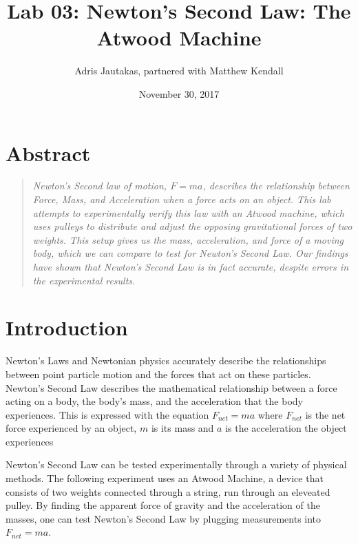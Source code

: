 \documentclass[12pt]{article}
\title{Lab 03: Newton's Second Law: The Atwood Machine}
\author{Adris Jautakas, partnered with Matthew Kendall}
\date{November 30, 2017}
\begin{document}
   \maketitle

    \section*{Abstract}
        \begin{quote}
        {\textit {\small 
            Newton's Second law of motion, $F = ma$, describes the relationship
            between Force, Mass, and Acceleration when a force acts on an
            object. This lab attempts to experimentally verify this law with
            an Atwood machine, which uses pulleys to distribute and adjust 
            the opposing gravitational forces of two weights. This setup
            gives us the mass, acceleration, and force of a moving body,
            which we can compare to test for Newton's Second Law. Our
            findings have shown that Newton's Second Law is in fact
            accurate, despite errors in the experimental results.
        } }
        \end{quote}
    \section{Introduction}
        \par Newton's Laws and Newtonian physics accurately describe the 
        relationships between point particle motion and the forces
        that act on these particles.
        Newton's Second Law describes the mathematical relationship 
        between a force acting on a body, the body's mass, and the
        acceleration that the body experiences. This is expressed with
        the equation $F_{net} = ma$ where $F_{net}$ is the net force experienced
        by an object, $m$ is its mass and $a$ is the acceleration the object
        experiences
        \par Newton's Second Law can be tested experimentally through a variety
        of physical methods. The following experiment uses an Atwood Machine,
        a device that consists of two weights connected through a string, run
        through an eleveated pulley. By finding the apparent force of gravity
        and the acceleration of the masses, one can test Newton's Second Law
        by plugging measurements into $F_{net} = ma$.

\end{document}
